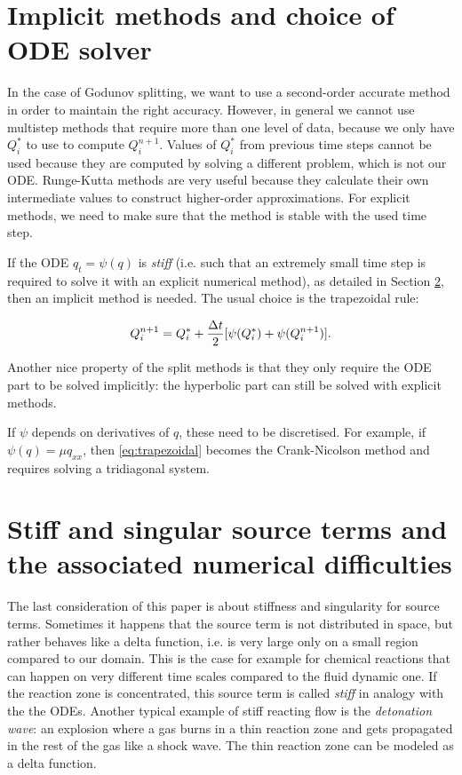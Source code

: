 \documentclass[journal,onecolumn]{IEEEtran}
\begin{document}
\vspace*{2cm}

\section{Implicit methods and choice of ODE solver}\label{sec:implicit}

In the case of Godunov splitting, we want to use a second-order accurate method in order to maintain the right accuracy. However, in general we cannot use multistep methods that require more than one level of data, because we only have $Q_i^*$ to use to compute $Q_i^{n+1}$. Values of $Q_i^*$ from previous time steps cannot be used because they are computed by solving a different problem, which is not our ODE. Runge-Kutta methods are very useful because they calculate their own intermediate values to construct higher-order approximations. For explicit methods, we need to make sure that the method is stable with the used time step.

If the ODE $q_t=\psi(q)$ is \textit{stiff} (i.e. such that an extremely small time step is required to solve it with an explicit numerical method), as detailed in Section \ref{sec:stiff}, then an implicit method is needed. The usual choice is the trapezoidal rule:

\begin{equation}\label{eq:trapezoidal}
	Q_i^{n+1} = Q_i^*+\frac{\Delta t}{2}[\psi(Q_i^*)+\psi(Q_i^{n+1})].
\end{equation}

Another nice property of the split methods is that they only require the ODE part to be solved implicitly: the hyperbolic part can still be solved with explicit methods.

If $\psi$ depends on derivatives of $q$, these need to be discretised. For example, if $\psi(q)=\mu q_{xx}$, then \eqref{eq:trapezoidal} becomes the Crank-Nicolson method and requires solving a tridiagonal system.

\section{Stiff and singular source terms and the associated numerical difficulties} \label{sec:stiff}

The last consideration of this paper is about stiffness and singularity for source terms. Sometimes it happens that the source term is not distributed in space, but rather behaves like a delta function, i.e. is very large only on a small region compared to our domain. This is the case for example for chemical reactions that can happen on very different time scales compared to the fluid dynamic one. If the reaction zone is concentrated, this source term is called \textit{stiff} in analogy with the the ODEs. Another typical example of stiff reacting flow is the \textit{detonation wave}: an explosion where a gas burns in a thin reaction zone and gets propagated in the rest of the gas like a shock wave. The thin reaction zone can be modeled as a delta function.
\end{document}
